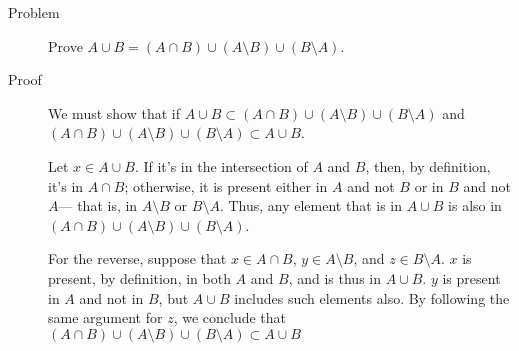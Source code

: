\begin{description}
\item[Problem]
Prove $A \cup B = (A \cap B) \cup (A \setminus B) \cup (B \setminus A)$.

\item[Proof]

We must show that if $A \cup B \subset (A \cap B) \cup (A \setminus B) \cup
(B \setminus A)$ and $(A \cap B) \cup (A \setminus B) \cup (B \setminus A)
\subset A \cup B$.

Let $x \in A \cup B$. If it's in the intersection of $A$ and $B$, then, by
definition, it's in $A \cap B$; otherwise, it is present either in $A$ and not
$B$ or in $B$ and not $A$--- that is, in $A \setminus B$ or $B \setminus A$.
Thus, any element that is in $A \cup B$ is also in $(A \cap B) \cup (A
\setminus B) \cup (B \setminus A)$.

For the reverse, suppose that $x \in A \cap B$, $y \in A \setminus B$, and $z
\in B \setminus A$. $x$ is present, by definition, in both $A$ and $B$, and is
thus in $A \cup B$. $y$ is present in $A$ and not in $B$, but $A \cup B$
includes such elements also. By following the same argument for $z$, we
conclude that $(A \cap B) \cup (A \setminus B) \cup (B \setminus A) \subset A
\cup B$

\end{description}
